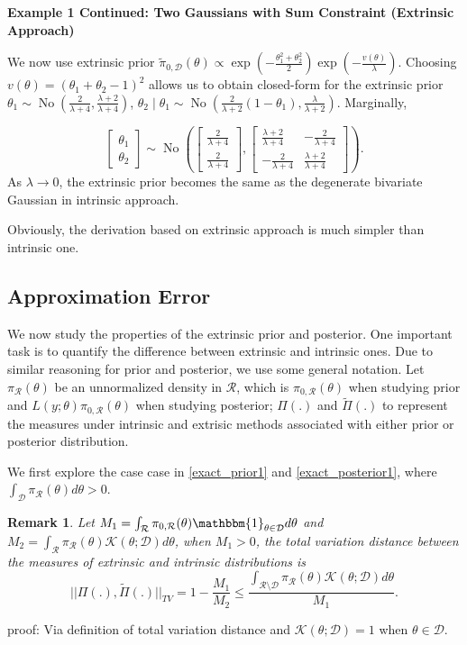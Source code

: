 \documentclass[10pt]{article}
\newtheorem{remark}{Remark}
\newcommand{\mc}[1]{\mathcal{#1}}
\DeclareMathOperator{\No}{No}
\DeclareMathOperator{\1}{\mathbbm{1}}
\begin{document}
{\bf Example 1 Continued: Two Gaussians with Sum Constraint (Extrinsic Approach)}

We now use extrinsic prior $\tilde\pi_{0,\mc D}(\theta) \propto \exp(-\frac{\theta_1^2+\theta_2^2}{2})\exp(-\frac{v(\theta)}{\lambda})$. Choosing $v(\theta)= (\theta_1+\theta_2-1)^2$ allows us to obtain closed-form for the extrinsic prior $\theta_1 \sim \No(\frac{2}{\lambda+4},\frac{\lambda+2}{\lambda+4})$, $\theta_2\mid \theta_1 \sim \No(\frac{2}{\lambda+2}(1-\theta_1),\frac{\lambda}{\lambda+2})$. Marginally, 

$$\begin{bmatrix} \theta_1 \\ \theta_2 \end{bmatrix} \sim
\No \left(
 \begin{bmatrix} \frac{2}{\lambda+4} \\ \frac{2}{\lambda+4} \end{bmatrix},
\begin{bmatrix} \frac{\lambda+2}{\lambda+4} & -\frac{2}{\lambda+4}  \\  -\frac{2}{\lambda+4}  &\frac{\lambda+2}{\lambda+4} \end{bmatrix}
\right).$$
As $\lambda\rightarrow 0$, the extrinsic prior becomes the same as the degenerate bivariate Gaussian in intrinsic approach.

Obviously, the derivation based on extrinsic approach is  much simpler than intrinsic one.

\subsection{Approximation Error}

We now study the properties of the extrinsic prior and posterior. One important task is to quantify the difference between extrinsic and intrinsic ones. Due to similar reasoning for prior and posterior, we use some general notation. Let $\pi_{\mc R}(\theta)$ be an unnormalized density in $\mc R$, which is $\pi_{0,\mc R}(\theta)$ when studying prior and $L(y;\theta)\pi_{0,\mc R}(\theta)$ when studying posterior; $\Pi(.)$ and $\tilde\Pi(.)$ to represent the measures under intrinsic and extrisic methods associated with either prior or posterior distribution. 

We first explore the case case in \eqref{exact_prior1} and  \eqref{exact_posterior1}, where $\int_{\mc D} \pi_{\mc R}(\theta)d\theta>0$.

\begin{remark}
Let $M_1= \int_{\mc R} \pi_{0,\mc R}(\theta) \mathbbm{1}_{\theta\in \mc D} d\theta$ and $M_2 = \int_{\mc R} \pi_{\mc R}(\theta) \mc K(\theta;\mc D)d\theta$, when $M_1>0$, the total variation distance between the measures of extrinsic and intrinsic distributions is
$$||\Pi(.), \tilde{\Pi}(.) ||_{TV} = 1 - \frac{M_1}{M_2} \le \frac{\int_{\mc R \setminus \mc D} \pi_{\mc R}(\theta) \mc K(\theta;\mc D)d\theta}{M_1}.$$
\end{remark}
proof:
{Via definition of total variation distance and $\mc K(\theta;\mc D)=1$ when $\theta\in\mc D$.}
\end{document}

